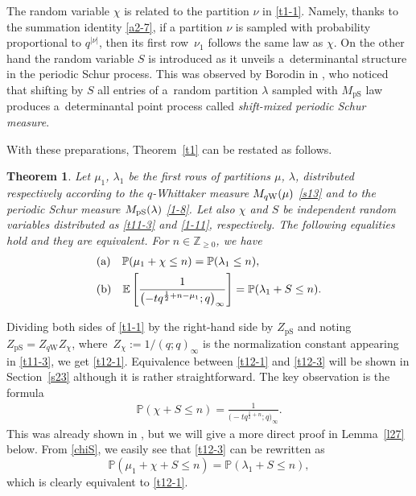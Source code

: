 \documentclass[pdftex]{sigma}
\numberwithin{equation}{section}
\newtheorem{Theorem}{Theorem}[section]
\newcommand{\E}[1]{\widetilde{e}_{#1}}
\def\E{\mathbb{E}}
\def\i{\infty}
\def\l{\lambda}
\def\P{\mathbb{P}}
\def\Z{\mathbb{Z}}
\begin{document}
The random variable $\chi$ is related to the partition $\nu$ in \eqref{t1-1}.
Namely, thanks to the summation identity \eqref{a2-7}, if a partition $\nu$ is sampled with probability proportional to $q^{|\nu|}$, then its first row~$\nu_1$ follows the same law as $\chi$. On the other hand the random variable $S$ is introduced as it unveils a~determinantal structure in the periodic Schur process. This was observed by Borodin in \cite{Borodin2007PeriodicSchur}, who noticed that shifting by $S$ all entries of a~random partition $\lambda$ sampled with $M_{\mathrm{pS}}$ law produces a~determinantal point process called \emph{shift-mixed periodic Schur measure}.


With these preparations, Theorem~\ref{t1} can be restated as follows.
 \begin{Theorem} \label{thm:intro_prob}\label{t12}
 Let $\mu_1$, $\lambda_1$ be the first rows of partitions $\mu$, $\lambda$, distributed respectively according to the $q$-Whittaker measure $M_{q{\rm W}}(\mu)$ \eqref{s13} and to the periodic Schur measure $M_{{\rm pS}}(\l)$ \eqref{1-8}. Let also $\chi$ and $S$ be independent random variables distributed as \eqref{t11-3} and \eqref{1-11}, respectively.
 The following equalities hold and they are equivalent. For $n\in\Z_{\ge 0}$,
 we have
 \begin{align}
 \label{t12-1}
& {\rm (a)}\quad \P (\mu_1+\chi\le n )=
 \P (\l_1\le n ),
\\
\label{t12-3} & {\rm (b)} \quad
 \E\left[\frac{1}{\bigl(-t q^{\frac12+n-\mu_1};q\bigr)_{\i}}\right]
 =
 \P(\l_1+S\le n).
\end{align}
\end{Theorem}
 Dividing both sides of \eqref{t1-1} by the right-hand side by $Z_{\textrm{pS}}$ and noting $Z_{\textrm{pS}}=Z_{q\textrm{W}}Z_{\chi}$, where~${Z_{\chi}:=1/(q;q)_{\infty}}$ is the normalization constant appearing in \eqref{t11-3}, we get \eqref{t12-1}.
 Equivalence between \eqref{t12-1} and \eqref{t12-3} will be shown in Section~\ref{s23} although it is rather straightforward.
 The key observation is the formula
 \begin{align}
 \label{chiS}
 \P(\chi+S\le n)
 =
 \frac{1}{\bigl(-t q^{\frac12+n};q\bigr)_{\i}}.
 \end{align}
 This was already shown in \cite[Section 2]{BeteaBouttier2019PeriodicSchur}, but we will give a more direct proof in Lemma~\ref{l27} below. From \eqref{chiS}, we easily see that \eqref{t12-3} can be rewritten as{\samepage
 \[\P(\mu_1+\chi+S\le n)
 =
 \P(\l_1+S\le n),\]
 which is clearly equivalent to \eqref{t12-1}.}
\end{document}
